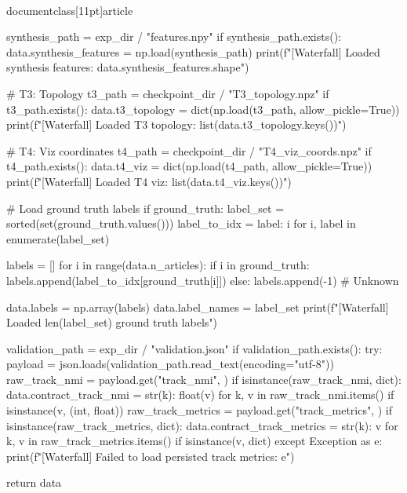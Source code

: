 \\documentclass[11pt]{article}
\begin{document}
\begin{CodeBlock}
    synthesis_path = exp_dir / "features.npy"
    if synthesis_path.exists():
        data.synthesis_features = np.load(synthesis_path)
        print(f"[Waterfall] Loaded synthesis features: {data.synthesis_features.shape}")

    # T3: Topology
    t3_path = checkpoint_dir / "T3_topology.npz"
    if t3_path.exists():
        data.t3_topology = dict(np.load(t3_path, allow_pickle=True))
        print(f"[Waterfall] Loaded T3 topology: {list(data.t3_topology.keys())}")

    # T4: Viz coordinates
    t4_path = checkpoint_dir / "T4_viz_coords.npz"
    if t4_path.exists():
        data.t4_viz = dict(np.load(t4_path, allow_pickle=True))
        print(f"[Waterfall] Loaded T4 viz: {list(data.t4_viz.keys())}")

    # Load ground truth labels
    if ground_truth:
        label_set = sorted(set(ground_truth.values()))
        label_to_idx = {label: i for i, label in enumerate(label_set)}

        labels = []
        for i in range(data.n_articles):
            if i in ground_truth:
                labels.append(label_to_idx[ground_truth[i]])
            else:
                labels.append(-1)  # Unknown

        data.labels = np.array(labels)
        data.label_names = label_set
        print(f"[Waterfall] Loaded {len(label_set)} ground truth labels")

    validation_path = exp_dir / "validation.json"
    if validation_path.exists():
        try:
            payload = json.loads(validation_path.read_text(encoding="utf-8"))
            raw_track_nmi = payload.get("track_nmi", {})
            if isinstance(raw_track_nmi, dict):
                data.contract_track_nmi = {
                    str(k): float(v)
                    for k, v in raw_track_nmi.items()
                    if isinstance(v, (int, float))
                }
            raw_track_metrics = payload.get("track_metrics", {})
            if isinstance(raw_track_metrics, dict):
                data.contract_track_metrics = {
                    str(k): v
                    for k, v in raw_track_metrics.items()
                    if isinstance(v, dict)
                }
        except Exception as e:
            print(f"[Waterfall] Failed to load persisted track metrics: {e}")

    return data



\end{CodeBlock}
\end{document}
